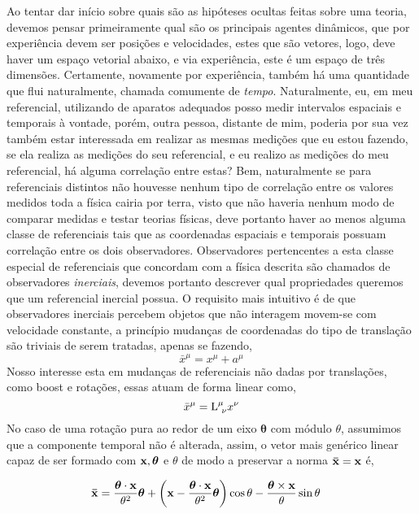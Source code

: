 \documentclass[twoside]{amsart}
\numberwithin{equation}{section}
\begin{document}
Ao tentar dar início sobre quais são as hipóteses ocultas feitas sobre uma teoria, devemos 
pensar primeiramente qual são os principais agentes dinâmicos, que por experiência devem ser 
posições e velocidades, estes que são vetores, logo, deve haver um espaço vetorial abaixo, 
e via experiência, este é um espaço de três dimensões. Certamente, novamente por experiência,  
também há uma quantidade que flui naturalmente, chamada comumente de \emph{tempo}. 
Naturalmente, eu, em meu referencial, utilizando de aparatos adequados posso medir intervalos 
espaciais e temporais à vontade, porém, outra pessoa, distante de mim, poderia por sua vez 
também estar interessada em realizar as mesmas medições que eu estou fazendo, se ela realiza 
as medições do seu referencial, e eu realizo as medições do meu referencial, há alguma 
correlação entre estas? Bem, naturalmente se para referenciais distintos não houvesse nenhum 
tipo de correlação entre os valores medidos toda a física cairia por terra, visto que não 
haveria nenhum modo de comparar medidas e testar teorias físicas, deve portanto haver ao menos 
alguma classe de referenciais tais que as coordenadas espaciais e temporais possuam correlação 
entre os dois observadores. Observadores pertencentes a esta classe especial de referenciais que concordam com a física descrita são chamados de observadores \emph{inerciais}, devemos portanto descrever qual propriedades queremos que um referencial inercial possua. O requisito mais intuitivo é de que observadores inerciais percebem objetos que não interagem movem-se com velocidade constante, a princípio mudanças de coordenadas do tipo de translação são triviais de serem tratadas, apenas se fazendo, $${\bar x}^\mu=x^\mu+a^\mu$$
Nosso interesse esta em mudanças de referenciais não dadas por translações, como boost e rotações, essas atuam de forma linear como, $${\bar x}^\mu={\textup L}^\mu_{\ \nu}x^\nu$$
No caso de uma rotação pura ao redor de um eixo $\boldsymbol\theta$ com módulo $\theta$, assumimos que a componente temporal não é alterada, assim, o vetor mais genérico linear capaz de ser formado com $\vb x,\boldsymbol\theta$ e $\theta$ de modo a preservar a norma $\vb{\bar x}=\vb x$ é,

\begin{align}
    \vb{\bar x}&=\frac{\boldsymbol\theta\cdot\vb x}{\theta^2}\boldsymbol\theta+\qty(\vb x-\frac{\boldsymbol\theta\cdot\vb x}{\theta^2}\boldsymbol\theta)\cos\theta-\frac{\boldsymbol\theta\times \vb x}{\theta}\sin\theta
\end{align}
\end{document}
